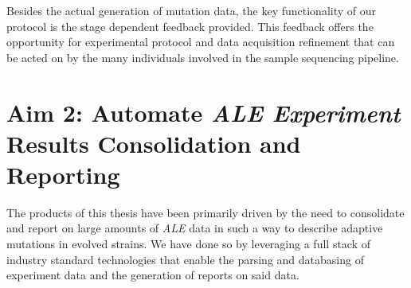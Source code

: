 \documentclass[12pt,final,masters,chapterheads]{ucsd}  %
\begin{document}
Besides the actual generation of mutation data, the key functionality of our protocol is the stage dependent feedback provided. This feedback offers the opportunity for experimental protocol and data acquisition refinement that can be acted on by the many individuals involved in the sample sequencing pipeline.

%
%
%
%

\chapter{Aim 2: Automate \textit{ALE Experiment} Results Consolidation and Reporting}

%
%



The products of this thesis have been primarily driven by the need to consolidate and report on large amounts of \textit{ALE} data in such a way to describe adaptive mutations in evolved strains. We have done so by leveraging a full stack of industry standard technologies that enable the parsing and databasing of experiment data and the generation of reports on said data.
\end{document}
